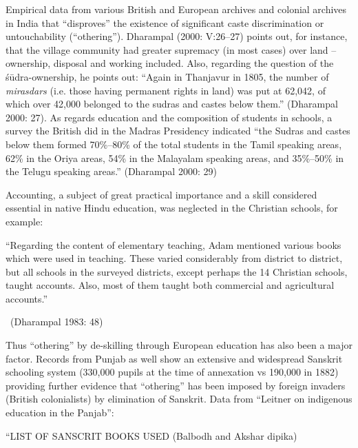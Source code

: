 Empirical data from various British and European archives and colonial archives in India that “disproves” the existence of significant caste discrimination or untouchability (“othering”). Dharampal (2000: V:26–27) points out, for instance, that the village community had greater supremacy (in most cases) over land – ownership, disposal and working included. Also, regarding the question of the śūdra-ownership, he points out: “Again in Thanjavur in 1805, the number of \textit{mirasdars} (i.e. those having permanent rights in land) was put at 62,042, of which over 42,000 belonged to the sudras and castes below them.” (Dharampal 2000: 27). As regards education and the composition of students in schools, a survey the British did in the Madras Presidency indicated “the Sudras and castes below them formed 70\%–80\% of the total students in the Tamil speaking areas, 62\% in the Oriya areas, 54\% in the Malayalam speaking areas, and 35\%–50\% in the Telugu speaking areas.” (Dharampal 2000: 29)

Accounting, a subject of great practical importance and a skill considered essential in native Hindu education, was neglected in the Christian schools, for example:

\begin{myquote}
“Regarding the content of elementary teaching, Adam mentioned various books which were used in teaching. These varied considerably from district to district, but all schools in the surveyed districts, except perhaps the 14 Christian schools, taught accounts. Also, most of them taught both commercial and agricultural accounts.” 

~\hfill (Dharampal 1983: 48)
\end{myquote}

Thus “othering” by de-skilling through European education has also been a major factor. Records from Punjab as well show an extensive and widespread Sanskrit schooling system (330,000 pupils at the time of annexation vs 190,000 in 1882) providing further evidence that “othering” has been imposed by foreign invaders (British colonialists) by elimination of Sanskrit. Data from “Leitner on indigenous education in the Panjab”:

“LIST OF SANSCRIT BOOKS USED (Balbodh and Akshar dipika)

\vspace{-.2cm}

